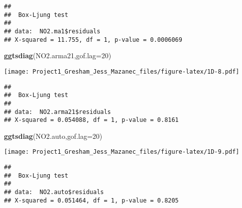 \documentclass[
]{article}
\newenvironment{Shaded}{\begin{snugshade}}{\end{snugshade}}
\newcommand{\CommentTok}[1]{\textcolor[rgb]{0.56,0.35,0.01}{\textit{#1}}}
\newcommand{\DataTypeTok}[1]{\textcolor[rgb]{0.13,0.29,0.53}{#1}}
\newcommand{\DecValTok}[1]{\textcolor[rgb]{0.00,0.00,0.81}{#1}}
\newcommand{\KeywordTok}[1]{\textcolor[rgb]{0.13,0.29,0.53}{\textbf{#1}}}
\newcommand{\NormalTok}[1]{#1}
\newcommand{\OperatorTok}[1]{\textcolor[rgb]{0.81,0.36,0.00}{\textbf{#1}}}
\newcommand{\StringTok}[1]{\textcolor[rgb]{0.31,0.60,0.02}{#1}}
\begin{document}
\begin{verbatim}
## 
##  Box-Ljung test
## 
## data:  NO2.ma1$residuals
## X-squared = 11.755, df = 1, p-value = 0.0006069
\end{verbatim}

\begin{Shaded}
\begin{Highlighting}[]
\KeywordTok{ggtsdiag}\NormalTok{(NO2.arma21,}\DataTypeTok{gof.lag=}\DecValTok{20}\NormalTok{)}
\end{Highlighting}
\end{Shaded}

\texttt{[image: Project1\_Gresham\_Jess\_Mazanec\_files/figure-latex/1D-8.pdf]}

\begin{Shaded}
\end{Shaded}

\begin{verbatim}
## 
##  Box-Ljung test
## 
## data:  NO2.arma21$residuals
## X-squared = 0.054088, df = 1, p-value = 0.8161
\end{verbatim}

\begin{Shaded}
\begin{Highlighting}[]
\KeywordTok{ggtsdiag}\NormalTok{(NO2.auto,}\DataTypeTok{gof.lag=}\DecValTok{20}\NormalTok{)}
\end{Highlighting}
\end{Shaded}

\texttt{[image: Project1\_Gresham\_Jess\_Mazanec\_files/figure-latex/1D-9.pdf]}

\begin{Shaded}
\end{Shaded}

\begin{verbatim}
## 
##  Box-Ljung test
## 
## data:  NO2.auto$residuals
## X-squared = 0.051464, df = 1, p-value = 0.8205
\end{verbatim}
\end{document}
